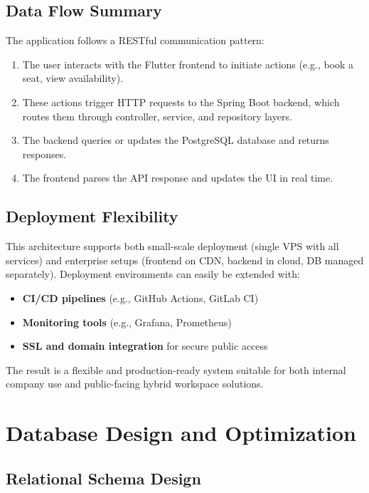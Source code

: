 \documentclass[12pt,a4paper]{report} %
\begin{document}
\subsection*{Data Flow Summary}

The application follows a RESTful communication pattern:
\begin{enumerate}
    \item The user interacts with the Flutter frontend to initiate actions (e.g., book a seat, view availability).
    \item These actions trigger HTTP requests to the Spring Boot backend, which routes them through controller, service, and repository layers.
    \item The backend queries or updates the PostgreSQL database and returns responses.
    \item The frontend parses the API response and updates the UI in real time.
\end{enumerate}

\subsection*{Deployment Flexibility}

This architecture supports both small-scale deployment (single VPS with all services) and enterprise setups (frontend on CDN, backend in cloud, DB managed separately). Deployment environments can easily be extended with:
\begin{itemize}
    \item \textbf{CI/CD pipelines} (e.g., GitHub Actions, GitLab CI)
    \item \textbf{Monitoring tools} (e.g., Grafana, Prometheus)
    \item \textbf{SSL and domain integration} for secure public access
\end{itemize}

The result is a flexible and production-ready system suitable for both internal company use and public-facing hybrid workspace solutions.

\newpage

\section{Database Design and Optimization}

\subsection{Relational Schema Design}
\end{document}
